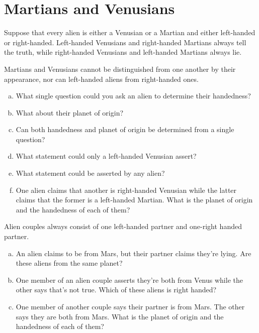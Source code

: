 \documentclass{article}
\begin{document}
\pagebreak

\section*{Martians and Venusians}
Suppose that every alien is either a Venusian or a Martian and either left-handed or right-handed. Left-handed Venusians and right-handed Martians always tell the truth, while right-handed Venusians and left-handed Martians always lie. 

\begin{prob}{1.4}
    Martians and Venusians cannot be distinguished from one another by their appearance, nor can left-handed aliens from right-handed ones.
    \begin{enumerate}[a)]
        \item What single question could you ask an alien to determine their handedness?
        \item What about their planet of origin?
        \item Can both handedness and planet of origin be determined from a single question?
        \item What statement could only a left-handed Venusian assert?
        \item What statement could be asserted by any alien?
        \item One alien claims that another is right-handed Venusian while the latter claims that the former is a left-handed Martian. What is the planet of origin and the handedness of each of them?
    \end{enumerate}
\end{prob}

\begin{prob}{1.5}
    Alien couples always consist of one left-handed partner and one-right handed partner.
    \begin{enumerate}[a)]
        \item An alien claims to be from Mars, but their partner claims they're lying. Are these aliens from the same planet?
        \item One member of an alien couple asserts they're both from Venus while the other says that's not true. Which of these aliens is right handed?
        \item One member of another couple says their partner is from Mars. The other says they are both from Mars. What is the planet of origin and the handedness of each of them?
    \end{enumerate}
\end{prob}
\end{document}
